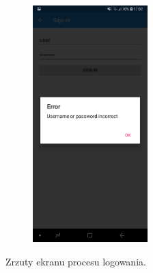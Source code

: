 \begin{figure}[!ht]
\begin{center}
\begin{subfigure}[b]{0.3\textwidth}
			\label{logowanie}
		\end{subfigure}
		\begin{subfigure}[b]{0.3\textwidth}
			\includegraphics[width=1.75in]{img/mobile/logowanie_haslo.jpg}
			\label{logowanie_haslo}
		\end{subfigure}
	\end{center}
	\caption{Zrzuty ekranu procesu logowania.}
\end{figure}

